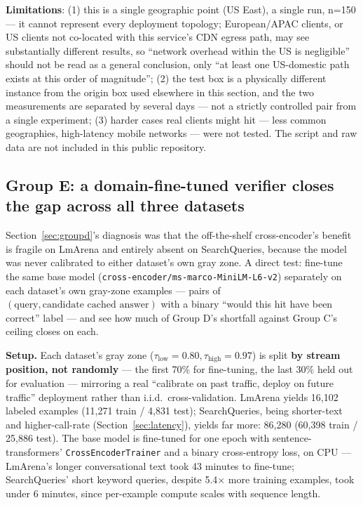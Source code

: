 \documentclass[11pt]{article}
\newcommand{\taulow}{\ensuremath{\tau_{\text{low}}}}
\newcommand{\tauhigh}{\ensuremath{\tau_{\text{high}}}}
\begin{document}
\textbf{Limitations}: (1) this is a single geographic point (US East), a single run, n=150 --- it cannot represent every deployment topology; European/APAC clients, or US clients not co-located with this service's CDN egress path, may see substantially different results, so ``network overhead within the US is negligible'' should not be read as a general conclusion, only ``at least one US-domestic path exists at this order of magnitude''; (2) the test box is a physically different instance from the origin box used elsewhere in this section, and the two measurements are separated by several days --- not a strictly controlled pair from a single experiment; (3) harder cases real clients might hit --- less common geographies, high-latency mobile networks --- were not tested. The script and raw data are not included in this public repository.

\subsection{Group E: a domain-fine-tuned verifier closes the gap across all three datasets}
\label{sec:groupe}

Section~\ref{sec:groupd}'s diagnosis was that the off-the-shelf cross-encoder's benefit is fragile on LmArena and entirely absent on SearchQueries, because the model was never calibrated to either dataset's own gray zone. A direct test: fine-tune the same base model (\texttt{cross-encoder/\allowbreak{}ms-marco-Mini\allowbreak{}LM-L6-v2}) separately on each dataset's own gray-zone examples --- pairs of $(\text{query}, \text{candidate cached answer})$ with a binary ``would this hit have been correct'' label --- and see how much of Group D's shortfall against Group C's ceiling closes on each.

\textbf{Setup.} Each dataset's gray zone ($\taulow=0.80, \tauhigh=0.97$) is split \textbf{by stream position, not randomly} --- the first 70\% for fine-tuning, the last 30\% held out for evaluation --- mirroring a real ``calibrate on past traffic, deploy on future traffic'' deployment rather than i.i.d.\ cross-validation. LmArena yields 16,102 labeled examples (11,271 train / 4,831 test); SearchQueries, being shorter-text and higher-call-rate (Section~\ref{sec:latency}), yields far more: 86,280 (60,398 train / 25,886 test). The base model is fine-tuned for one epoch with sentence-transformers' \texttt{Cross\allowbreak{}Encoder\allowbreak{}Trainer} and a binary cross-entropy loss, on CPU --- LmArena's longer conversational text took 43 minutes to fine-tune; SearchQueries' short keyword queries, despite 5.4$\times$ more training examples, took under 6 minutes, since per-example compute scales with sequence length.
\end{document}

